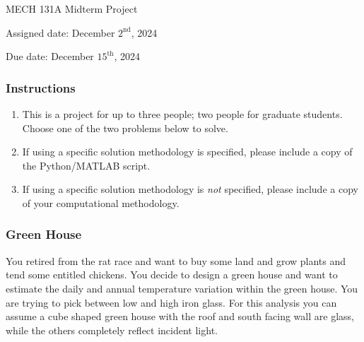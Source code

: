 \documentclass[12pt,letterpaper]{article}
\begin{document}
\noindent
MECH 131A Midterm Project

\noindent
Assigned date: December $2^{\mathrm{nd}}$, 2024

\noindent
Due date: December $15^{\mathrm{th}}$, 2024

\subsubsection*{Instructions}
\begin{enumerate}
	\item This is a project for up to three people; two people for graduate students.
		Choose one of the two problems below to solve.
	\item If using a specific solution methodology is specified, please include a copy of the Python/MATLAB script.
	\item If using a specific solution methodology is \textit{not} specified, please include a copy of your computational methodology.
\end{enumerate}

\subsubsection*{Green House}

You retired from the rat race and want to buy some land and grow plants and tend some entitled chickens.
You decide to design a green house and want to estimate the daily and annual temperature variation within the green house.
You are trying to pick between low and high iron glass.
For this analysis you can assume a cube shaped green house with the roof and south facing wall are glass, while the others completely reflect incident light.
\end{document}
